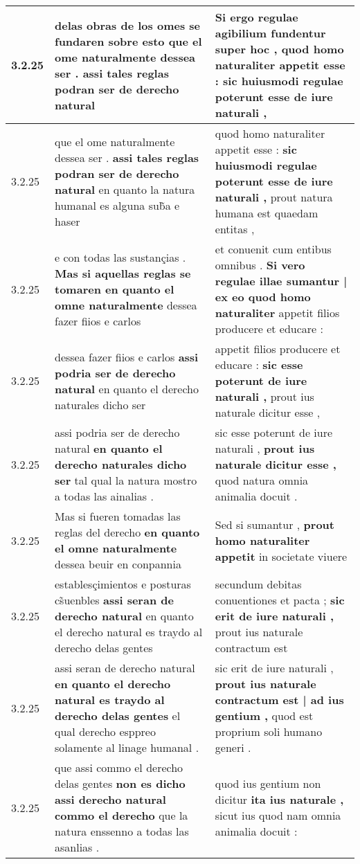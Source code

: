 \begin{tabular}{|p{1cm}|p{6.5cm}|p{6.5cm}|}
3.2.25 & delas obras de los omes se fundaren sobre esto \textbf{ que el ome naturalmente dessea ser . } assi tales reglas podran ser de derecho natural & Si ergo regulae agibilium fundentur super hoc , \textbf{ quod homo naturaliter appetit esse : } sic huiusmodi regulae poterunt esse de iure naturali , \\\hline
3.2.25 & que el ome naturalmente dessea ser . \textbf{ assi tales reglas podran ser de derecho natural } en quanto la natura humanal es alguna sub̃a e haser & quod homo naturaliter appetit esse : \textbf{ sic huiusmodi regulae poterunt esse de iure naturali , } prout natura humana est quaedam entitas , \\\hline
3.2.25 & e con todas las sustançias . \textbf{ Mas si aquellas reglas se tomaren en quanto el omne naturalmente } dessea fazer fiios e carlos & et conuenit cum entibus omnibus . \textbf{ Si vero regulae illae sumantur | ex eo quod homo naturaliter } appetit filios producere et educare : \\\hline
3.2.25 & dessea fazer fiios e carlos \textbf{ assi podria ser de derecho natural } en quanto el derecho naturales dicho ser & appetit filios producere et educare : \textbf{ sic esse poterunt de iure naturali , } prout ius naturale dicitur esse , \\\hline
3.2.25 & assi podria ser de derecho natural \textbf{ en quanto el derecho naturales dicho ser } tal qual la natura mostro a todas las ainalias . & sic esse poterunt de iure naturali , \textbf{ prout ius naturale dicitur esse , } quod natura omnia animalia docuit . \\\hline
3.2.25 & Mas si fueren tomadas las reglas del derecho \textbf{ en quanto el omne naturalmente } dessea beuir en conpannia & Sed si sumantur , \textbf{ prout homo naturaliter appetit } in societate viuere \\\hline
3.2.25 & establesçimientos e posturas cs̃uenbles \textbf{ assi seran de derecho natural } en quanto el derecho natural es traydo al derecho delas gentes & secundum debitas conuentiones et pacta ; \textbf{ sic erit de iure naturali , } prout ius naturale contractum est \\\hline
3.2.25 & assi seran de derecho natural \textbf{ en quanto el derecho natural es traydo al derecho delas gentes } el qual derecho esppreo solamente al linage humanal . & sic erit de iure naturali , \textbf{ prout ius naturale contractum est | ad ius gentium , } quod est proprium soli humano generi . \\\hline
3.2.25 & que assi commo el derecho delas gentes \textbf{ non es dicho assi derecho natural commo el derecho } que la natura enssenno a todas las asanlias . & quod ius gentium non dicitur \textbf{ ita ius naturale , } sicut ius quod nam omnia animalia docuit : \\\hline

\end{tabular}
